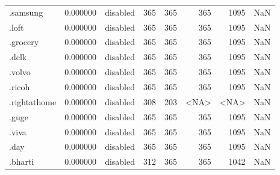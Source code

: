 \begin{tabular}{lrlrrrrl}
.samsung                  &          0.000000 &        disabled &                         365 &                         365 &                         365 &                1095 &                  NaN \\
.loft                     &          0.000000 &        disabled &                         365 &                         365 &                         365 &                1095 &                  NaN \\
.grocery                  &          0.000000 &        disabled &                         365 &                         365 &                         365 &                1095 &                  NaN \\
.dclk                     &          0.000000 &        disabled &                         365 &                         365 &                         365 &                1095 &                  NaN \\
.volvo                    &          0.000000 &        disabled &                         365 &                         365 &                         365 &                1095 &                  NaN \\
.ricoh                    &          0.000000 &        disabled &                         365 &                         365 &                         365 &                1095 &                  NaN \\
.rightathome              &          0.000000 &        disabled &                         308 &                         203 &                        <NA> &                <NA> &                  NaN \\
.guge                     &          0.000000 &        disabled &                         365 &                         365 &                         365 &                1095 &                  NaN \\
.viva                     &          0.000000 &        disabled &                         365 &                         365 &                         365 &                1095 &                  NaN \\
.day                      &          0.000000 &        disabled &                         365 &                         365 &                         365 &                1095 &                  NaN \\
.bharti                   &          0.000000 &        disabled &                         312 &                         365 &                         365 &                1042 &                  NaN \\

\end{tabular}
